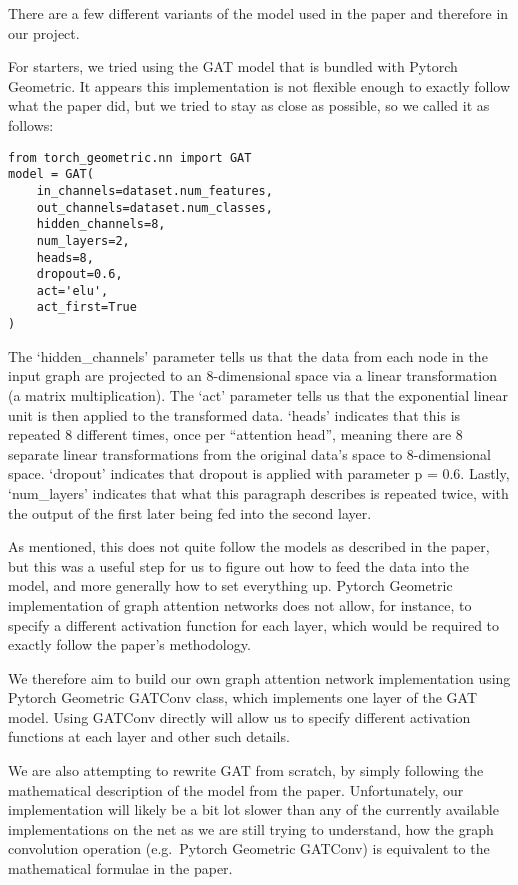 There are a few different variants of the model used in the paper and
therefore in our project.

For starters, we tried using the GAT model that is bundled with Pytorch
Geometric.
It appears this implementation is not flexible enough to exactly
follow what the paper did, but we tried to stay as close as possible, so we
called it as follows:

\begin{verbatim}
from torch_geometric.nn import GAT
model = GAT(
    in_channels=dataset.num_features,
    out_channels=dataset.num_classes,
    hidden_channels=8,
    num_layers=2,
    heads=8,
    dropout=0.6,
    act='elu',
    act_first=True
)
\end{verbatim}



The `hidden\_channels' parameter tells us that the data from each node in the
input graph are projected to an 8-dimensional space via a linear
transformation (a matrix multiplication).
The `act' parameter tells us that
the exponential linear unit is then applied to the transformed data.
`heads' indicates that this is repeated 8 different times, once per ``attention head'',
meaning there are 8 separate linear transformations from the original data's
space to 8-dimensional space.
`dropout' indicates that dropout is applied with
parameter p = 0.6. Lastly, `num\_layers' indicates that what this paragraph
describes is repeated twice, with the output of the first later being fed into
the second layer.

As mentioned, this does not quite follow the models as described in the paper,
but this was a useful step for us to figure out how to feed the data into the
model, and more generally how to set everything up.
Pytorch Geometric implementation of graph attention networks does not allow, for instance, to
specify a different activation function for each layer, which would be
required to exactly follow the paper's methodology.

We therefore aim to build our own graph attention network implementation using
Pytorch Geometric GATConv class, which implements one layer of the GAT
model. Using GATConv directly will allow us to specify different activation functions at each layer and other such details.

We are also attempting to rewrite GAT from scratch, by simply following the
mathematical description of the model from the paper.
Unfortunately, our implementation will likely be a bit lot slower than any of the currently
available implementations on the net as we are still trying to understand, how the graph convolution operation
(e.g.\ Pytorch Geometric GATConv) is equivalent to the mathematical formulae in the paper.
